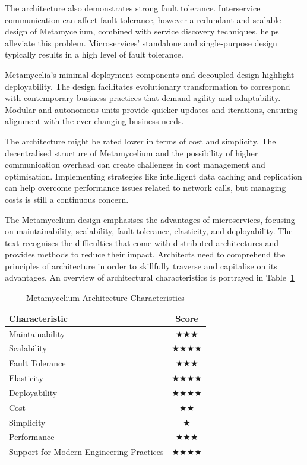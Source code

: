 \documentclass[journal]{IEEEtran}
\begin{document}
The architecture also demonstrates strong fault tolerance. Interservice communication can affect fault tolerance, however a redundant and scalable design of Metamycelium, combined with service discovery techniques, helps alleviate this problem. Microservices' standalone and single-purpose design typically results in a high level of fault tolerance.

Metamycelia's minimal deployment components and decoupled design highlight deployability. The design facilitates evolutionary transformation to correspond with contemporary business practices that demand agility and adaptability. Modular and autonomous units provide quicker updates and iterations, ensuring alignment with the ever-changing business needs.

The architecture might be rated lower in terms of cost and simplicity. The decentralised structure of Metamycelium and the possibility of higher communication overhead can create challenges in cost management and optimisation. Implementing strategies like intelligent data caching and replication can help overcome performance issues related to network calls, but managing costs is still a continuous concern.

The Metamycelium design emphasises the advantages of microservices, focusing on maintainability, scalability, fault tolerance, elasticity, and deployability. The text recognises the difficulties that come with distributed architectures and provides methods to reduce their impact. Architects need to comprehend the principles of architecture in order to skillfully traverse and capitalise on its advantages. An overview of architectural characteristics is portrayed in Table~\ref{tab:architecture-characteristics}

\begin{table}[t]
  \centering
  \caption{Metamycelium Architecture Characteristics}
  \label{tab:architecture-characteristics}
  \begin{tabular}{|l|c|}
    \hline
    \textbf{Characteristic} & \textbf{Score} \\
    \hline
    Maintainability & $\bigstar\bigstar\bigstar$ \\
    \hline
    Scalability & $\bigstar\bigstar\bigstar\bigstar$ \\
    \hline
    Fault Tolerance & $\bigstar\bigstar\bigstar$ \\
    \hline
    Elasticity & $\bigstar\bigstar\bigstar\bigstar$ \\
    \hline
    Deployability & $\bigstar\bigstar\bigstar\bigstar$ \\
    \hline
    Cost & $\bigstar\bigstar$ \\
    \hline
    Simplicity & $\bigstar$ \\
    \hline
    Performance & $\bigstar\bigstar\bigstar$ \\
    \hline
    Support for Modern Engineering Practices & $\bigstar\bigstar\bigstar\bigstar$ \\
    \hline
  \end{tabular}
\end{table}
\end{document}
